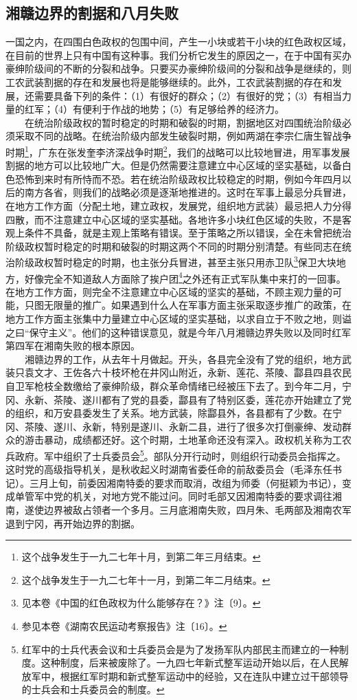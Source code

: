\documentclass[cn,11pt,chinese]{elegantbook}
\def\myformat#1{\hfil\hfil #1}
\begin{document}
\subsection*{\myformat{湘赣边界的割据和八月失败}}
一国之内，在四围白色政权的包围中间，产生一小块或若干小块的红色政权区域，在目前的世界上只有中国有这种事。我们分析它发生的原因之一，在于中国有买办豪绅阶级间的不断的分裂和战争。只要买办豪绅阶级间的分裂和战争是继续的，则工农武装割据的存在和发展也将是能够继续的。此外，工农武装割据的存在和发展，还需要具备下列的条件：（1）有很好的群众；（2）有很好的党；（3）有相当力量的红军；（4）有便利于作战的地势；（5）有足够给养的经济力。\\
　　在统治阶级政权的暂时稳定的时期和破裂的时期，割据地区对四围统治阶级必须采取不同的战略。在统治阶级内部发生破裂时期，例如两湖在李宗仁唐生智战争时期\footnote[1]{ 这个战争发生于一九二七年十月，到第二年三月结束。}，广东在张发奎李济深战争时期\footnote[2]{ 这个战争发生于一九二七年十一月，到第二年二月结束。}，我们的战略可以比较地冒进，用军事发展割据的地方可以比较地广大。但是仍然需要注意建立中心区域的坚实基础，以备白色恐怖到来时有所恃而不恐。若在统治阶级政权比较稳定的时期，例如今年四月以后的南方各省，则我们的战略必须是逐渐地推进的。这时在军事上最忌分兵冒进，在地方工作方面（分配土地，建立政权，发展党，组织地方武装）最忌把人力分得四散，而不注意建立中心区域的坚实基础。各地许多小块红色区域的失败，不是客观上条件不具备，就是主观上策略有错误。至于策略之所以错误，全在未曾把统治阶级政权暂时稳定的时期和破裂的时期这两个不同的时期分别清楚。有些同志在统治阶级政权暂时稳定的时期，也主张分兵冒进，甚至主张只用赤卫队\footnote[3]{ 见本卷《中国的红色政权为什么能够存在？》注〔9〕。}保卫大块地方，好像完全不知道敌人方面除了挨户团\footnote[4]{ 参见本卷《湖南农民运动考察报告》注〔16〕。}之外还有正式军队集中来打的一回事。在地方工作方面，则完全不注意建立中心区域的坚实的基础，不顾主观力量的可能，只图无限量的推广。如果遇到什么人在军事方面主张采取逐步推广的政策，在地方工作方面主张集中力量建立中心区域的坚实基础，以求自立于不败之地，则谥之曰“保守主义”。他们的这种错误意见，就是今年八月湘赣边界失败以及同时红军第四军在湘南失败的根本原因。\\
　　湘赣边界的工作，从去年十月做起。开头，各县完全没有了党的组织，地方武装只袁文才、王佐各六十枝坏枪在井冈山附近，永新、莲花、茶陵、酃县四县农民自卫军枪枝全数缴给了豪绅阶级，群众革命情绪已经被压下去了。到今年二月，宁冈、永新、茶陵、遂川都有了党的县委，酃县有了特别区委，莲花亦开始建立了党的组织，和万安县委发生了关系。地方武装，除酃县外，各县都有了少数。在宁冈、茶陵、遂川、永新，特别是遂川、永新二县，进行了很多次打倒豪绅、发动群众的游击暴动，成绩都还好。这个时期，土地革命还没有深入。政权机关称为工农兵政府。军中组织了士兵委员会\footnote[5]{ 红军中的士兵代表会议和士兵委员会是为了发扬军队内部民主而建立的一种制度。这种制度，后来被废除了。一九四七年新式整军运动开始以后，在人民解放军中，根据红军时期和新式整军运动中的经验，又在连队中建立过干部领导的士兵会和士兵委员会的制度。}。部队分开行动时，则组织行动委员会指挥之。这时党的高级指导机关，是秋收起义时湖南省委任命的前敌委员会（毛泽东任书记）。三月上旬，前委因湘南特委的要求而取消，改组为师委（何挺颖为书记），变成单管军中党的机关，对地方党不能过问。同时毛部又因湘南特委的要求调往湘南，遂使边界被敌占领者一个多月。三月底湘南失败，四月朱、毛两部及湘南农军退到宁冈，再开始边界的割据。\\
\end{document}
